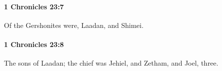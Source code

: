 		\paragraph{1 Chronicles 23:7} %
			\label{1CHRONICLES-23-7}

			Of the Gershonites were, Laadan, and Shimei.


		\paragraph{1 Chronicles 23:8} %
			\label{1CHRONICLES-23-8}

			The sons of Laadan; the chief was Jehiel, and Zetham, and Joel, three.


